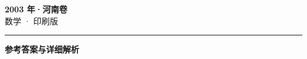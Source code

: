 \documentclass[zihao=5, a4paper]{ctexart}
\begin{document}
\begin{center}
  {\Large\bfseries 2003 年·河南卷}\\[4pt]
  {\large 数学 · 印刷版}
\end{center}
\medskip
{}

\par\bigskip\hrule\bigskip
{}
\begin{center}{\large\bfseries 参考答案与详细解析}\end{center}
\smallskip

\end{document}
